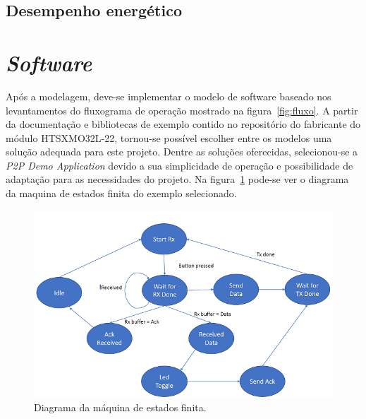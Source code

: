 \subsection{Desempenho energético}


\section{\textit{Software}}
Após a modelagem, deve-se implementar o modelo de software baseado nos levantamentos do fluxograma de operação mostrado na figura~\ref{fig:fluxo}. A partir da documentação e bibliotecas de exemplo contido no repositório do fabricante do módulo HTSXMO32L-22, tornou-se possível escolher entre os modelos uma solução adequada para este projeto.
Dentre as soluções oferecidas, selecionou-se a \textit{P2P Demo Application} devido a sua simplicidade de operação e possibilidade de adaptação para as necessidades do projeto. Na figura~\ref{fig:p2p} pode-se ver o diagrama da maquina de estados finita do exemplo selecionado.

\begin{figure}
  \caption{Diagrama da máquina de estados finita.}
  \begin{center}
      \includegraphics[scale=0.8]{img/p2p_fsm.PNG}
  \end{center}
  \label{fig:p2p}
\end{figure}

